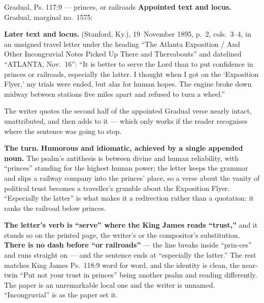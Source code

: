 \begin{afterlife}{Gradual, Ps. 117:9 --- princes, or railroads}
\textbf{Appointed text and locus.} Gradual, marginal no.~1575: 

\textbf{Later text and locus.}  (Stanford,
Ky.), 19~November 1895, p.~2, cols.~3--4, in an unsigned travel letter under the
heading ``The Atlanta Exposition / And Other Incongruvial Notes Picked Up There
and Thereabouts'' and datelined ``ATLANTA, Nov.\ 16'': ``It is better to serve
the Lord than to put confidence in princes or railroads, especially the latter.
I thought when I got on the `Exposition Flyer,' my trials were ended, but alas
for human hopes. The engine broke down midway between stations five miles apart
and refused to turn a wheel.''

The writer quotes the second half of the appointed Gradual verse nearly intact,
unattributed, and then adds to it --- which only works if the reader recognises
where the sentence was going to stop.

\textbf{The turn.} \textbf{Humorous and idiomatic, achieved by a single
appended noun.} The psalm's antithesis is between divine and human
reliability, with ``princes'' standing for the highest human power; the letter
keeps the grammar and slips a railway company into the princes' place, so a
verse about the vanity of political trust becomes a traveller's grumble about
the Exposition Flyer. ``Especially the latter'' is what makes it a redirection
rather than a quotation: it ranks the railroad below princes.

\textbf{The letter's verb is ``serve'' where the King James reads ``trust,''}
and it stands so on the printed page, the writer's or the compositor's
substitution. \textbf{There is no dash
before ``or railroads''} --- the line breaks inside ``prin-ces'' and runs
straight on --- and the sentence ends at ``especially the latter.'' The rest
matches King James Ps.\ 118:9 word for word, and the identity is clean, the
near-twin ``Put not your trust in princes'' being another psalm and reading
differently. The paper is an unremarkable local one and the writer is unnamed.
``Incongruvial'' is as the paper set it.
\end{afterlife}

